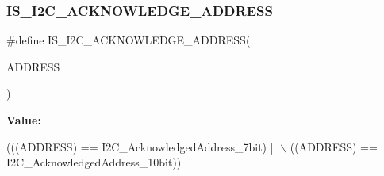 \subsubsection{\texorpdfstring{I\+S\+\_\+\+I2\+C\+\_\+\+A\+C\+K\+N\+O\+W\+L\+E\+D\+G\+E\+\_\+\+A\+D\+D\+R\+E\+SS}{IS\_I2C\_ACKNOWLEDGE\_ADDRESS}}
{\footnotesize\ttfamily \#define I\+S\+\_\+\+I2\+C\+\_\+\+A\+C\+K\+N\+O\+W\+L\+E\+D\+G\+E\+\_\+\+A\+D\+D\+R\+E\+SS(\begin{DoxyParamCaption}\item[{}]{A\+D\+D\+R\+E\+SS }\end{DoxyParamCaption})}

{\bfseries Value\+:}
\begin{DoxyCode}
(((ADDRESS) == I2C\_AcknowledgedAddress\_7bit) || \(\backslash\)
                                             ((ADDRESS) == I2C\_AcknowledgedAddress\_10bit))
\end{DoxyCode}
